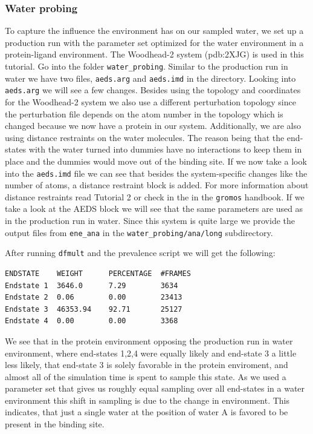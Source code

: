 \subsubsection{Water probing}
To capture the influence the environment has on our sampled water, we set up a production run with the parameter set optimized for the water environment in a protein-ligand environment. The Woodhead-2 system (pdb:2XJG\cite{woodhead2}) is used in this tutorial. Go into the folder \texttt{water\_probing}. Similar to the production run in water we have two files, \texttt{aeds.arg} and \texttt{aeds.imd} in the directory. Looking into \texttt{aeds.arg} we will see a few changes. Besides using the topology and coordinates for the Woodhead-2 system we also use a different perturbation topology since the perturbation file depends on the atom number in the topology which is changed because we now have a protein in our system. Additionally, we are also using distance restraints on the water molecules. The reason being that the end-states with the water turned into dummies have no interactions to keep them in place and the dummies would move out of the binding site. If we now take a look into the \texttt{aeds.imd} file we can see that besides the system-specific changes like the number of atoms, a distance restraint block is added. For more information about distance restraints read Tutorial 2 or check in the in the  \texttt{gromos} handbook. If we take a look at the AEDS block we will see that the same parameters are used as in the production run in water. Since this system is quite large we provide the output files from \texttt{ene\_ana} in the \texttt{water\_probing/ana/long} subdirectory.

After running \texttt{dfmult} and the prevalence script we will get the following:

\begin{lstlisting}
ENDSTATE    WEIGHT      PERCENTAGE  #FRAMES
Endstate 1  3646.0      7.29        3634
Endstate 2  0.06        0.00        23413
Endstate 3  46353.94    92.71       25127
Endstate 4  0.00        0.00        3368
\end{lstlisting}

We see that in the protein environment opposing the production run in water environment, where end-states 1,2,4 were equally likely and end-state 3 a little less likely, that end-state 3 is solely favorable in the protein enviroment, and almost all of the simulation time is spent to sample this state. As we used a parameter set that gives us roughly equal sampling over all end-states in a water environment this shift in sampling is due to the change in environment. This indicates, that just a single water at the position of water A is favored to be present in the binding site. 

